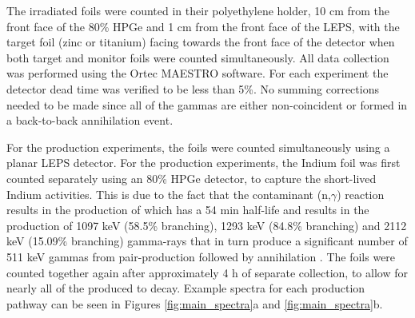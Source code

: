 The irradiated foils were counted in their polyethylene holder, 10 cm from the front face of the 80\% HPGe and 1 cm from the front face of the LEPS, with the target foil (zinc or titanium) facing towards the front face of the detector when both target and monitor foils were counted simultaneously.
All data collection was performed using the Ortec MAESTRO software.
For each experiment the detector dead time was verified to be less than 5\%.
 No summing corrections needed to be made since all of the gammas are either non-coincident or formed in a back-to-back annihilation event.
 

For the   production experiments, the foils were counted simultaneously using a planar LEPS detector.
For the  production experiments, the Indium foil was first counted separately using an 80\% HPGe detector, to capture the short-lived Indium activities.
This is due to the fact that the contaminant (n,$\gamma$) reaction results in the production of  which has a 54 min half-life and results in the production of 1097 keV (58.5\% branching), 1293 keV (84.8\% branching) and 2112 keV (15.09\% branching) gamma-rays that in turn produce a significant number of 511 keV gammas from pair-production followed by annihilation \cite{Blachot2010}.
The foils were counted together again after approximately 4 h of separate collection, to allow for nearly all of the produced  to decay.
Example spectra for each production pathway can be seen in Figures \autoref{fig:main_spectra}a and \autoref{fig:main_spectra}b.



